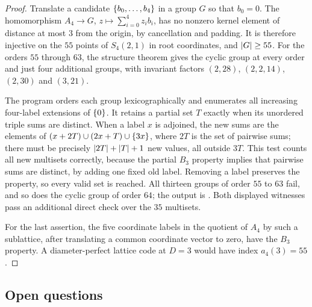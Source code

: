 \begin{proof}
Translate a candidate $\{b_0,\ldots,b_4\}$ in a group $G$ so that $b_0=0$. The
homomorphism $A_4\to G$, $z\mapsto\sum_{i=0}^4z_ib_i$, has no nonzero kernel element of
distance at most $3$ from the origin, by cancellation and padding. It is therefore
injective on the $55$ points of $S_4(2,1)$ in root coordinates, and $\lvert G\rvert\ge55$. For
the orders $55$ through $63$, the structure theorem gives the cyclic group at every
order and just four additional groups, with invariant factors $(2,28)$, $(2,2,14)$,
$(2,30)$ and $(3,21)$.

The program  orders
each group lexicographically and enumerates all increasing four-label extensions of
$\{0\}$. It retains a partial set $T$ exactly when its unordered triple sums are
distinct. When a label $x$ is adjoined, the new sums are the elements of
$(x+2T)\cup(2x+T)\cup\{3x\}$, where $2T$ is the set of pairwise sums; there must be
precisely $\lvert2T\rvert+\lvert T\rvert+1$ new values, all outside $3T$. This test counts all new
multisets correctly, because the partial $B_3$ property implies that pairwise sums are
distinct, by adding one fixed old label. Removing a label preserves the property, so
every valid set is reached. All thirteen groups of order $55$ to $63$ fail, and so does
the cyclic group of order $64$; the output is
. Both displayed
witnesses pass an additional direct check over the $35$ multisets.

For the last assertion, the five coordinate labels in the quotient of $A_4$ by such a
sublattice, after translating a common coordinate vector to zero, have the $B_3$
property. A diameter-perfect lattice code at $D=3$ would have index $a_4(3)=55$.
\end{proof}

\subsection{Open questions}\label{gpp:sec:open}
{\raggedright{}}

